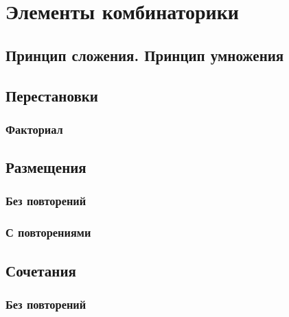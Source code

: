 \documentclass[
  letterpaper,
]{scrbook}
\theoremstyle{definition}
\theoremstyle{remark}
\begin{document}

\chapter{Элементы комбинаторики}\label{math-combinatorics}

\section{Принцип сложения. Принцип
умножения}\label{ux43fux440ux438ux43dux446ux438ux43f-ux441ux43bux43eux436ux435ux43dux438ux44f.-ux43fux440ux438ux43dux446ux438ux43f-ux443ux43cux43dux43eux436ux435ux43dux438ux44f}

\section{Перестановки}\label{ux43fux435ux440ux435ux441ux442ux430ux43dux43eux432ux43aux438}

\subsection{Факториал}\label{ux444ux430ux43aux442ux43eux440ux438ux430ux43b}

\section{Размещения}\label{ux440ux430ux437ux43cux435ux449ux435ux43dux438ux44f}

\subsection{Без
повторений}\label{ux431ux435ux437-ux43fux43eux432ux442ux43eux440ux435ux43dux438ux439}

\subsection{С
повторениями}\label{ux441-ux43fux43eux432ux442ux43eux440ux435ux43dux438ux44fux43cux438}

\section{Сочетания}\label{ux441ux43eux447ux435ux442ux430ux43dux438ux44f}

\subsection{Без
повторений}\label{ux431ux435ux437-ux43fux43eux432ux442ux43eux440ux435ux43dux438ux439-1}
\end{document}
